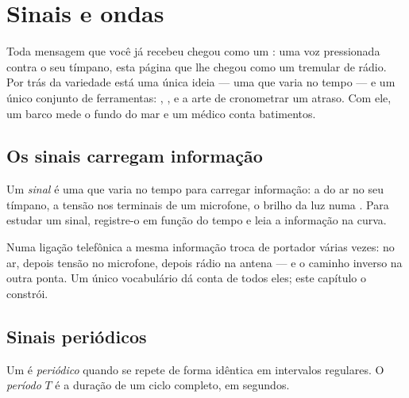 \chapter{Sinais e ondas}\label{ch:g10:signals-and-waves}

Toda mensagem que você já recebeu chegou como um : uma voz
pressionada contra o seu tímpano, esta página que lhe chegou como um
tremular de rádio. Por trás da variedade está uma única ideia --- uma
 que varia no tempo --- e um único conjunto de
ferramentas: , ,  e a arte de cronometrar um
atraso. Com ele, um barco mede o fundo do mar e um médico conta
batimentos.

\section{Os sinais carregam informação}

\begin{definition}[Sinal]\label{def:g10:signals-and-waves:signal}
Um \emph{sinal} é uma  que varia no tempo
para carregar informação: a  do ar no seu tímpano, a tensão nos
terminais de um microfone, o brilho da luz numa . Para
estudar um sinal, registre-o em função do tempo e leia a informação na
curva.
\end{definition}

Numa ligação telefônica a mesma informação troca de portador várias
vezes:  no ar, depois tensão no microfone, depois rádio na antena
--- e o caminho inverso na outra ponta. Um único vocabulário dá conta de
todos eles; este capítulo o constrói.

\section{Sinais periódicos}

\begin{definition}\label{def:g10:signals-and-waves:period}
Um  é \emph{periódico} quando se repete de
forma idêntica em intervalos regulares. O \emph{período}
$T$ é a duração de um ciclo completo, em segundos.
\end{definition}

